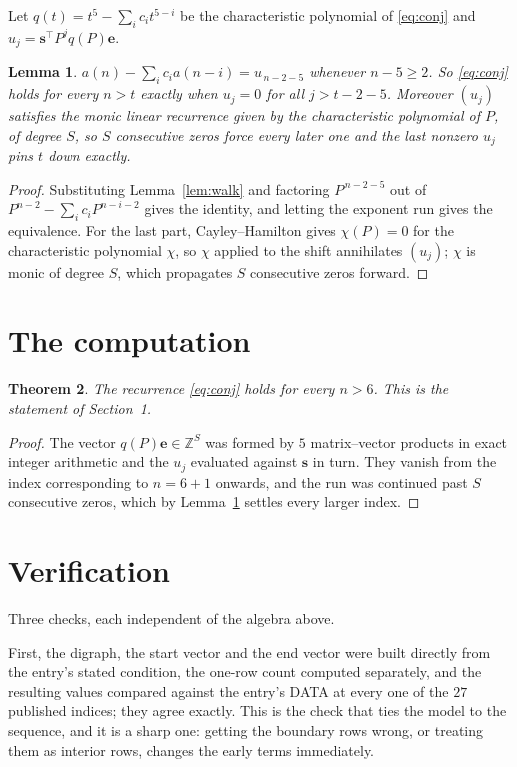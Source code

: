 \documentclass[11pt,a4paper]{article}
\theoremstyle{plain}
\newtheorem{theorem}{Theorem}
\newtheorem{lemma}[theorem]{Lemma}
\theoremstyle{definition}
\begin{document}
Let $q(t)=t^{5}-\sum_i c_i t^{5-i}$ be the characteristic polynomial of
\eqref{eq:conj} and $u_j=\mathbf{s}^{\!\top}P^{j}q(P)\mathbf{e}$.

\begin{lemma}\label{lem:crit}
$a(n)-\sum_i c_i a(n-i)=u_{\,n-2-5}$ whenever $n-5\ge2$. So \eqref{eq:conj}
holds for every $n>t$ exactly when $u_j=0$ for all $j>t-2-5$. Moreover $(u_j)$
satisfies the monic linear recurrence given by the characteristic polynomial of $P$, of
degree $S$, so $S$ consecutive zeros force every later one and the last nonzero $u_j$ pins
$t$ down exactly.
\end{lemma}

\begin{proof}
Substituting Lemma~\ref{lem:walk} and factoring $P^{\,n-2-5}$ out of
$P^{n-2}-\sum_i c_i P^{n-i-2}$ gives the identity, and letting the exponent run gives the
equivalence. For the last part, Cayley--Hamilton gives $\chi(P)=0$ for the characteristic
polynomial $\chi$, so $\chi$ applied to the shift annihilates $(u_j)$; $\chi$ is monic of
degree $S$, which propagates $S$ consecutive zeros forward.
\end{proof}

\section{The computation}

\begin{theorem}
The recurrence \eqref{eq:conj} holds for every $n>6$. This is the statement of
Section~1.
\end{theorem}

\begin{proof}
The vector $q(P)\mathbf{e}\in\mathbb{Z}^{S}$ was formed by $5$ matrix--vector
products in exact integer arithmetic and the $u_j$ evaluated against $\mathbf{s}$ in turn.
They vanish from the index corresponding to $n=6+1$ onwards, and the run was continued
past $S$ consecutive zeros, which by Lemma~\ref{lem:crit} settles every larger index.
\end{proof}

\section{Verification}

Three checks, each independent of the algebra above.

First, the digraph, the start vector and the end vector were built directly from the
entry's stated condition, the one-row count computed separately, and the resulting values
compared against the entry's DATA at every one of the $27$ published indices; they
agree exactly. This is the check that ties the model to the sequence, and it is a sharp one:
getting the boundary rows wrong, or treating them as interior rows, changes the early terms
immediately.
\end{document}
